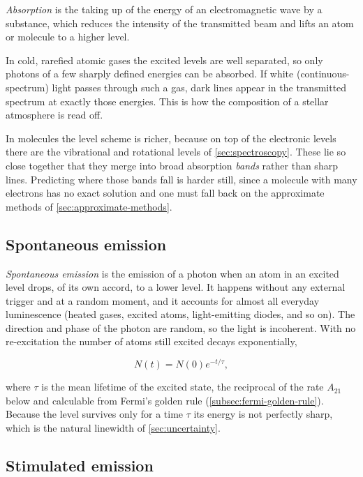         \emph{Absorption} is the taking up of the energy of an electromagnetic wave by a substance, which reduces the intensity of the transmitted beam and lifts an atom or molecule to a higher level.

        In cold, rarefied atomic gases the excited levels are well separated, so only photons of a few sharply defined energies can be absorbed. If white (continuous-spectrum) light passes through such a gas, dark lines appear in the transmitted spectrum at exactly those energies. This is how the composition of a stellar atmosphere is read off.

        In molecules the level scheme is richer, because on top of the electronic levels there are the vibrational and rotational levels of \cref{sec:spectroscopy}. These lie so close together that they merge into broad absorption \emph{bands} rather than sharp lines. Predicting where those bands fall is harder still, since a molecule with many electrons has no exact solution and one must fall back on the approximate methods of \cref{sec:approximate-methods}.

    \subsection{Spontaneous emission}

        \emph{Spontaneous emission} is the emission of a photon when an atom in an excited level drops, of its own accord, to a lower level. It happens without any external trigger and at a random moment, and it accounts for almost all everyday luminescence (heated gases, excited atoms, light-emitting diodes, and so on). The direction and phase of the photon are random, so the light is incoherent. With no re-excitation the number of atoms still excited decays exponentially,

        \begin{equation*}
            N\left(t\right) = N\left(0\right)e^{-t/\tau},
        \end{equation*}

        where $\tau$ is the mean lifetime of the excited state, the reciprocal of the rate $A_{21}$ below and calculable from Fermi's golden rule (\cref{subsec:fermi-golden-rule}). Because the level survives only for a time $\tau$ its energy is not perfectly sharp, which is the natural linewidth of \cref{sec:uncertainty}.

    \subsection{Stimulated emission}

